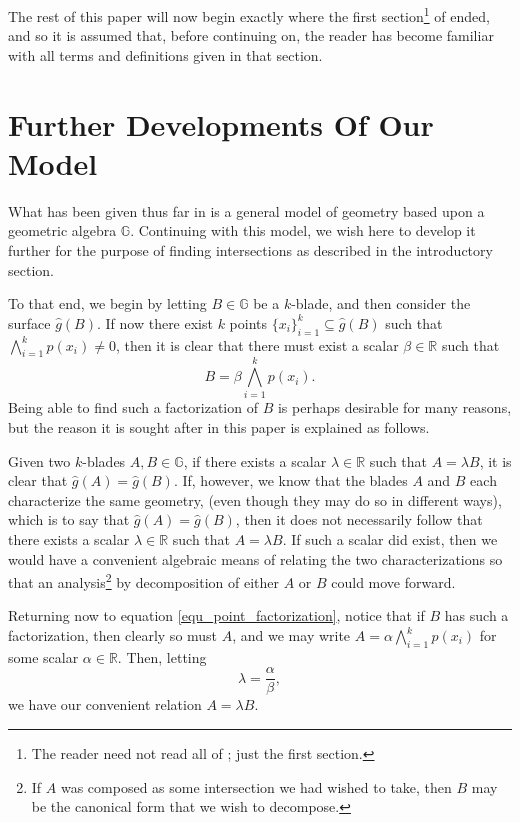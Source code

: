 \documentclass{birkjour}
\theoremstyle{definition}
\theoremstyle{remark}
\numberwithin{equation}{section}
\newcommand{\R}{\mathbb{R}}
\newcommand{\G}{\mathbb{G}}
\newcommand{\gh}{\hat{g}}
\begin{document}
The rest of this paper will now begin exactly where the first section\footnote{The reader
need not read all of \cite{}; just the first section.} of \cite{} ended, and
so it is assumed that, before continuing on, the reader has become familiar with
all terms and definitions given in that section.

\section{Further Developments Of Our Model}

What has been given thus far in \cite{} is a general model of geometry based upon
a geometric algebra $\G$.  Continuing with this model, we wish here to develop it
further for the purpose of finding intersections as described in the introductory section.

To that end, we begin by letting $B\in\G$ be a $k$-blade, and then consider the surface $\gh(B)$.
If now there exist $k$ points $\{x_i\}_{i=1}^k\subseteq\gh(B)$ such that $\bigwedge_{i=1}^k p(x_i)\neq 0$,
then it is clear that there must exist a scalar $\beta\in\R$ such that
\begin{equation}\label{equ_point_factorization}
B = \beta\bigwedge_{i=1}^k p(x_i).
\end{equation}
Being able to find such a factorization of $B$ is perhaps desirable for many reasons, but the
reason it is sought after in this paper is explained as follows.

Given two $k$-blades $A,B\in\G$, if there exists a scalar $\lambda\in\R$
such that $A=\lambda B$, it is clear that $\gh(A)=\gh(B)$.  If, however, we know that
the blades $A$ and $B$ each characterize the same geometry, (even though they may do so in different ways),
which is to say that $\gh(A)=\gh(B)$, then it does not necessarily follow that there exists a
scalar $\lambda\in\R$ such that $A=\lambda B$.  If such a scalar did exist, then
we would have a convenient algebraic means of relating the two characterizations so that
an analysis\footnote{If $A$ was composed as some intersection we had wished to take,
then $B$ may be the canonical form
that we wish to decompose.} by decomposition of either $A$ or $B$ could move forward.

Returning now to equation \eqref{equ_point_factorization}, notice that if $B$ has
such a factorization, then clearly so must $A$, and we may write $A=\alpha\bigwedge_{i=1}^k p(x_i)$
for some scalar $\alpha\in\R$.  Then, letting
\begin{equation*}
\lambda=\frac{\alpha}{\beta},
\end{equation*}
we have our convenient relation $A=\lambda B$.
\end{document}
